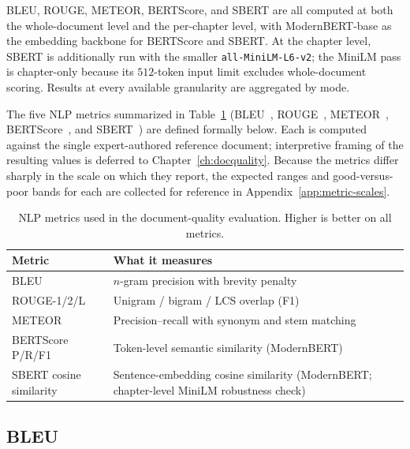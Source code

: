 BLEU, ROUGE, METEOR, BERTScore, and SBERT are all computed at both the whole-document level and the per-chapter level, with ModernBERT-base as the embedding backbone for BERTScore and SBERT. At the chapter level, SBERT is additionally run with the smaller \texttt{all-MiniLM-L6-v2}; the MiniLM pass is chapter-only because its $512$-token input limit excludes whole-document scoring. Results at every available granularity are aggregated by mode.

The five NLP metrics summarized in Table~\ref{tab:nlp-metrics-overview} (BLEU~\cite{Papineni2002}, ROUGE~\cite{Lin2004}, METEOR~\cite{Banerjee2005}, BERTScore~\cite{Zhang2020}, and SBERT~\cite{Reimers2019}) are defined formally below. Each is computed against the single expert-authored reference document; interpretive framing of the resulting values is deferred to Chapter~\ref{ch:docquality}. Because the metrics differ sharply in the scale on which they report, the expected ranges and good-versus-poor bands for each are collected for reference in Appendix~\ref{app:metric-scales}.

\begin{table}[htbp]
    \centering
    \begin{tabularx}{\linewidth}{@{}l X@{}}
        \toprule
        Metric & What it measures \\
        \midrule
        BLEU                      & $n$-gram precision with brevity penalty \\
        ROUGE-1/2/L               & Unigram / bigram / LCS overlap (F1) \\
        METEOR                    & Precision--recall with synonym and stem matching \\
        BERTScore P/R/F1          & Token-level semantic similarity (ModernBERT) \\
        SBERT cosine similarity   & Sentence-embedding cosine similarity (ModernBERT; chapter-level MiniLM robustness check) \\
        \bottomrule
    \end{tabularx}
    \caption{NLP metrics used in the document-quality evaluation. Higher is better on all metrics.}
    \label{tab:nlp-metrics-overview}
\end{table}

\subsection{BLEU}

